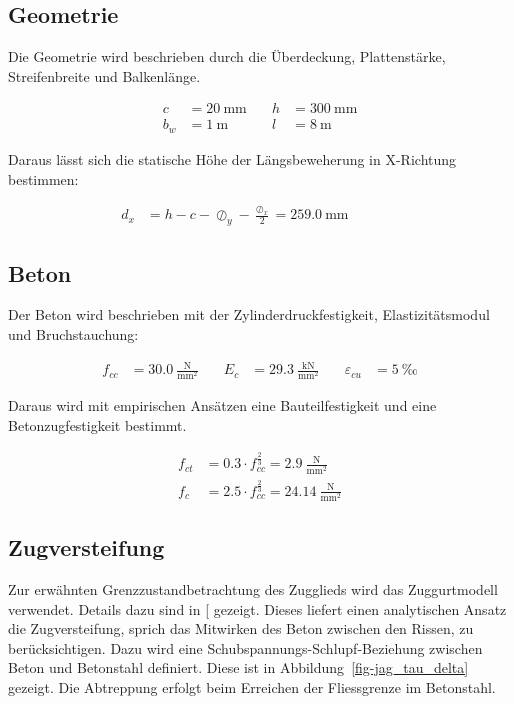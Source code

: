 \documentclass[
  11pt,
  letterpaper,
]{scrreprt}
\begin{document}
\subsection{Geometrie}\label{geometrie-1}

Die Geometrie wird beschrieben durch die Überdeckung, Plattenstärke,
Streifenbreite und Balkenlänge.

\[
\begin{aligned}
c& = 20 \ \mathrm{mm} \quad & h& = 300 \ \mathrm{mm} \\ 
b_{w}& = 1 \ \mathrm{m} \quad & l& = 8 \ \mathrm{m} \end{aligned}
\]

Daraus lässt sich die statische Höhe der Längsbeweherung in X-Richtung
bestimmen:

\[
\begin{aligned}
d_{x}& = h - c - \oslash_{y} - \frac{\oslash_{x}}{2} = 259.0 \ \mathrm{mm} \quad &  \quad &  
 \end{aligned}
\]

\subsection{Beton}\label{beton-1}

Der Beton wird beschrieben mit der Zylinderdruckfestigkeit,
Elastizitätsmodul und Bruchstauchung:

\[
\begin{aligned}
f_{cc}& = 30.0 \ \frac{\mathrm{N}}{\mathrm{mm}^{2}} \quad & E_{c}& = 29.3 \ \frac{\mathrm{kN}}{\mathrm{mm}^{2}} \quad & \varepsilon_{cu}& = 5 \ \mathrm{‰} \end{aligned}
\]

Daraus wird mit empirischen Ansätzen eine Bauteilfestigkeit und eine
Betonzugfestigkeit bestimmt.

\[
\begin{aligned}
f_{ct}& = 0.3 \cdot f_{cc}^{\frac{2}{3}} = 2.9 \ \frac{\mathrm{N}}{\mathrm{mm}^{2}} \\ 
f_{c}& = 2.5 \cdot f_{cc}^{\frac{2}{3}} = 24.14 \ \frac{\mathrm{N}}{\mathrm{mm}^{2}} \end{aligned}
\]

\subsection{Zugversteifung}\label{zugversteifung-1}

Zur erwähnten Grenzzustandbetrachtung des Zugglieds wird das
Zuggurtmodell verwendet. Details dazu sind in
{[}\citeproc{ref-gitz_ansatze_2024}{7}{]} gezeigt. Dieses liefert einen
analytischen Ansatz die Zugversteifung, sprich das Mitwirken des Beton
zwischen den Rissen, zu berücksichtigen. Dazu wird eine
Schubspannungs-Schlupf-Beziehung zwischen Beton und Betonstahl
definiert. Diese ist in Abbildung~\ref{fig-jag_tau_delta} gezeigt. Die
Abtreppung erfolgt beim Erreichen der Fliessgrenze im Betonstahl.
\end{document}
